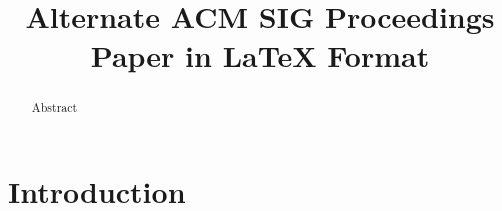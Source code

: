 \documentclass{sig-alternate-05-2015}
\begin{document}



%

\title{Alternate {\ttlit ACM} SIG Proceedings Paper in LaTeX
Format}
%
%
%
%
%

%
\maketitle
\begin{abstract}
Abstract
\end{abstract}


\section{Introduction}
\end{document}
